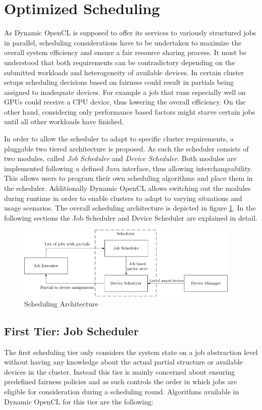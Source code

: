 \section{Optimized Scheduling}
\label{optimized_scheduling}
As Dynamic OpenCL is supposed to offer its services to variously structured jobs in parallel, scheduling considerations have to be undertaken to maximize the overall system efficiency and ensure a fair resource sharing process. It must be understood that both requirements can be contradictory depending on the submitted workloads and heterogeneity of available devices. In certain cluster setups scheduling decisions based on fairness could result in partials being assigned to inadequate devices. For example a job that runs especially well on GPUs could receive a CPU device, thus lowering the overall efficiency. On the other hand, considering only performance based factors might starve certain jobs until all other workloads have finished.

In order to allow the scheduler to adapt to specific cluster requirements, a pluggable two tiered architecture is proposed. As such the scheduler consists of two modules, called \textit{Job Scheduler} and \textit{Device Scheduler}. Both modules are implemented following a defined Java interface, thus allowing interchangeability. This allows users to program their own scheduling algorithms and place them in the scheduler. Additionally Dynamic OpenCL allows switching out the modules during runtime in order to enable clusters to adapt to varying situations and usage scenarios. The overall scheduling architecture is depicted in figure \ref{img:scheduling_arch}. In the following sections the Job Scheduler and Device Scheduler are explained in detail.

\begin{figure}[!htb]
	\includegraphics[width=0.95\textwidth]{drawings/scheduling_arch.pdf}
	\centering
	\caption{Scheduling Architecture}
	\label{img:scheduling_arch}
\end{figure}

\subsection{First Tier: Job Scheduler}
The first scheduling tier only considers the system state on a job abstraction level without having any knowledge about the actual partial structure or available devices in the cluster. Instead this tier is mainly concerned about ensuring predefined fairness policies and as such controls the order in which jobs are eligible for consideration during a scheduling round. Algorithms available in Dynamic OpenCL for this tier are the following:

